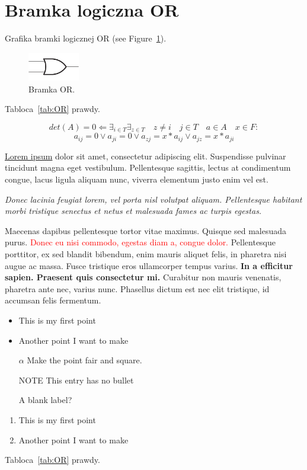 \section{Bramka logiczna OR}%
\label{sec:guszcza}

Grafika bramki logicznej OR (see Figure~\ref{fig:or}).

\begin{figure}[hthp] %
    \centering
    \includegraphics[width=0.2\textwidth]{pictures/OR.png} %
    \caption{Bramka OR.}
    \label{fig:or}
\end{figure}

Tabloca~\ref{tab:OR} prawdy. %


\pagebreak
$$ det(A) = 0 \Leftarrow \exists_{i \in T} \exists_{z \in T } \quad  z \not= i \quad j \in T \quad a\in A \quad x \in F:$$$$a_{ij} = 0 \vee  a_{ji} = 0 \vee a_{zj} = x*a_{ij} \vee a_{jz} = x*a_{ji}$$
\begin{flushleft}
\underline{Lorem ipsum} dolor sit amet, consectetur adipiscing elit. Suspendisse pulvinar tincidunt magna eget vestibulum. Pellentesque sagittis, lectus at condimentum congue, lacus ligula aliquam nunc, viverra elementum justo enim vel est.    
\end{flushleft}
\begin{center}
\emph{Donec lacinia feugiat lorem, vel porta nisl volutpat aliquam. Pellentesque habitant morbi tristique senectus et netus et malesuada fames ac turpis egestas.}\par
Maecenas dapibus pellentesque tortor vitae maximus. Quisque sed malesuada purus. \textcolor{red}{Donec eu nisi commodo, egestas diam a, congue dolor.} Pellentesque porttitor, ex sed blandit bibendum, enim mauris aliquet felis, in pharetra nisi augue ac massa. Fusce tristique eros ullamcorper tempus varius. \textbf{In a efficitur sapien. Praesent quis consectetur mi.} Curabitur non mauris venenatis, pharetra ante nec, varius nunc. Phasellus dictum est nec elit tristique, id accumsan felis fermentum.
\end{center}

\begin{itemize}
  \item This is my first point
  \item Another point I want to make 
  \item[$\alpha$] Make the point fair and square.
  \item[NOTE] This entry has no bullet
  \item[] A blank label?
\end{itemize}
\vspace{5pt}
\begin{enumerate}
  \item This is my first point
  \item Another point I want to make 
\end{enumerate}
Tabloca~\ref{tab:OR} prawdy.